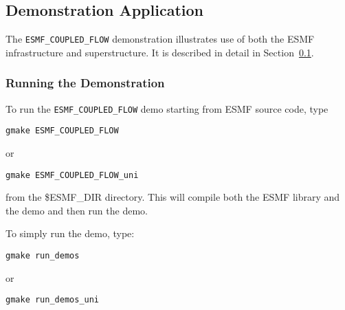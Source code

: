 \subsection{Demonstration Application}
\label{sec:demo}

The {\tt ESMF\_COUPLED\_FLOW} demonstration illustrates use of both the
ESMF infrastructure and superstructure.  It is described in detail in 
Section~\ref{sec:demo}.

\subsubsection{Running the Demonstration}

To run the {\tt ESMF\_COUPLED\_FLOW} demo starting from ESMF source code, type 
\begin{verbatim}
gmake ESMF_COUPLED_FLOW
\end{verbatim}
or
\begin{verbatim}
gmake ESMF_COUPLED_FLOW_uni
\end{verbatim}
from the \$ESMF\_DIR directory.  This will compile both the 
ESMF library and the demo and then run the demo.

To simply run the demo, type:

\begin{verbatim}
gmake run_demos
\end{verbatim}
or
\begin{verbatim}
gmake run_demos_uni
\end{verbatim}





